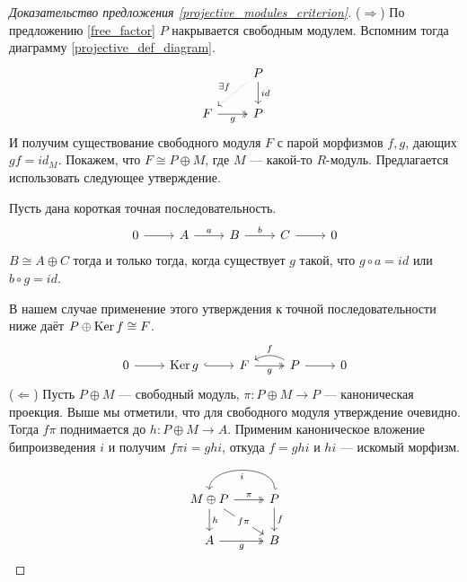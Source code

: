 \documentclass[../hw_main.tex]{subfiles}
\begin{document}
\begin{proof}[Доказательство предложения \ref{projective_modules_criterion}]
    ($\Rightarrow$) По предложению \ref{free_factor} $P$ накрывается свободным модулем. Вспомним тогда диаграмму \eqref{projective_def_diagram}.
    \begin{equation*}
        \begin{tikzcd}
	& P \\
	F & P
	\arrow["g"', two heads, from=2-1, to=2-2]
	\arrow["id", from=1-2, to=2-2]
	\arrow["{\exists f}"', dotted, from=1-2, to=2-1]
\end{tikzcd}
    \end{equation*}
    И получим существование свободного модуля $F$ с парой морфизмов $f, g$, дающих $gf=id_M$. Покажем, что $F\cong P\oplus M$, где $M$ --- какой-то $R$-модуль. Предлагается использовать следующее утверждение.
    \begin{to_suj}
    Пусть дана короткая точная последовательность.
    \begin{equation*}
        \begin{tikzcd}
	0 & A & B & C & 0
	\arrow[from=1-1, to=1-2]
	\arrow["a", from=1-2, to=1-3]
	\arrow["b", from=1-3, to=1-4]
	\arrow[from=1-4, to=1-5]
\end{tikzcd}
    \end{equation*}
    $B\cong A\oplus C$ тогда и только тогда, когда существует $g$ такой, что $g\circ a = id$ или $b\circ g = id$.
    \end{to_suj}
    В нашем случае применение этого утверждения к точной последовательности ниже даёт $P\oplus \mathop{\mathrm{Ker}}\nolimits f \cong F$.
    \begin{equation*}
        \begin{tikzcd}
	0 & {\Ker g} & F & P & 0
	\arrow[from=1-1, to=1-2]
	\arrow[hook, from=1-2, to=1-3]
	\arrow["g"', two heads, from=1-3, to=1-4]
	\arrow[from=1-4, to=1-5]
	\arrow["f"', bend right, from=1-4, to=1-3]
\end{tikzcd}
    \end{equation*}
($\Leftarrow$) Пусть $P\oplus M$ --- свободный модуль, $\pi: P\oplus M \to P$ --- каноническая проекция. Выше мы отметили, что для свободного модуля утверждение очевидно. Тогда $f\pi$ поднимается до $h:P\oplus M \to A$. Применим каноническое вложение бипроизведения $i$ и получим $f\pi i = ghi$, откуда $f = ghi$ и $hi$ --- искомый морфизм.
    \begin{equation*}
        \begin{tikzcd}
	{M\oplus P} & P \\
	A & B
	\arrow["g"', two heads, from=2-1, to=2-2]
	\arrow["f", from=1-2, to=2-2]
	\arrow["\pi", two heads, from=1-1, to=1-2]
	\arrow["i", bend right=90, hook', from=1-2, to=1-1]
	\arrow["h", from=1-1, to=2-1]
	\arrow["f\pi"{description}, from=1-1, to=2-2]
\end{tikzcd}
    \end{equation*}
\end{proof}
\end{document}
